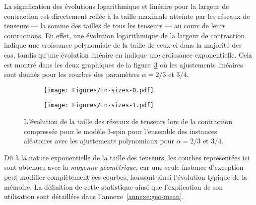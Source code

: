 La signification des évolutions logarithmique et linéaire pour la largeur de contraction est directement reliée à la taille maximale atteinte par les réseaux de tenseurs --- la somme des tailles de tous les tenseurs --- au cours de leurs contractions.
En effet, une évolution logarithmique de la largeur de contraction indique une croissance polynomiale de la taille de ceux-ci dans la majorité des cas, tandis qu'une évolution linéaire en indique une croissance exponentielle.
Cela est montré dans les deux graphiques de la figure~\ref{fig:tn-sizes} où les ajustements linéaires sont donnés pour les courbes des paramètres $\alpha = 2/3$ et $3/4$.
\begin{figure}[h]
    \centering
    \begin{subfigure}{.49\textwidth}
        \centering
        \texttt{[image: Figures/tn-sizes-0.pdf]}
        \caption{}
        \label{subfig:tn-sizes-0}
    \end{subfigure}
    \hfill
    \begin{subfigure}{.49\textwidth}
        \centering
        \texttt{[image: Figures/tn-sizes-1.pdf]}
        \caption{}
        \label{subfig:tn-sizes-1}
    \end{subfigure}
    \caption[L'évolution de la taille des réseaux de tenseurs lors de la contraction compressée pour le modèle $3$-spin.]{L'évolution de la taille des réseaux de tenseurs lors de la contraction compressée pour le modèle $3$-spin pour l'ensemble des instances aléatoires avec les ajustements polynomiaux pour $\alpha = 2/3$ et $3/4$.}
    \label{fig:tn-sizes}
\end{figure}
Dû à la nature exponentielle de la taille des tenseurs, les courbes représentées ici sont obtenues avec la \emph{moyenne géométrique}, car une seule instance d'exception peut modifier complètement ces courbes, faussant ainsi l'évolution typique de la mémoire.
La définition de cette statistique ainsi que l'explication de son utilisation sont détaillées dans l'annexe~\ref{annexe:geo-mean}.

